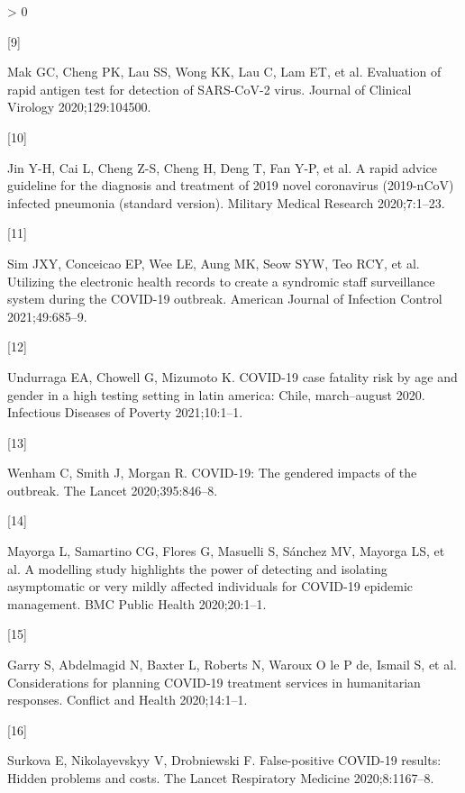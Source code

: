 \documentclass[]{elsarticle} %
\newlength{\cslhangindent}
\newlength{\csllabelwidth}
\newenvironment{CSLReferences}[2] %
 {%
  \setlength{\parindent}{0pt}
  \ifodd #1 \everypar{\setlength{\hangindent}{\cslhangindent}}\ignorespaces\fi
  \ifnum #2 > 0
  \setlength{\parskip}{#2\baselineskip}
  \fi
 }%
 {}
\newcommand{\CSLLeftMargin}[1]{\parbox[t]{\csllabelwidth}{#1}}
\newcommand{\CSLRightInline}[1]{\parbox[t]{\linewidth - \csllabelwidth}{#1}\break}
\begin{document}
\begin{CSLReferences}{0}{0}
\leavevmode\hypertarget{ref-mak2020evaluation}{}%
\CSLLeftMargin{{[}9{]} }
\CSLRightInline{Mak GC, Cheng PK, Lau SS, Wong KK, Lau C, Lam ET, et al. Evaluation of rapid antigen test for detection of SARS-CoV-2 virus. Journal of Clinical Virology 2020;129:104500.}

\leavevmode\hypertarget{ref-jin2020rapid}{}%
\CSLLeftMargin{{[}10{]} }
\CSLRightInline{Jin Y-H, Cai L, Cheng Z-S, Cheng H, Deng T, Fan Y-P, et al. A rapid advice guideline for the diagnosis and treatment of 2019 novel coronavirus (2019-nCoV) infected pneumonia (standard version). Military Medical Research 2020;7:1--23.}

\leavevmode\hypertarget{ref-sim2021utilizing}{}%
\CSLLeftMargin{{[}11{]} }
\CSLRightInline{Sim JXY, Conceicao EP, Wee LE, Aung MK, Seow SYW, Teo RCY, et al. Utilizing the electronic health records to create a syndromic staff surveillance system during the COVID-19 outbreak. American Journal of Infection Control 2021;49:685--9.}

\leavevmode\hypertarget{ref-undurraga2021covid}{}%
\CSLLeftMargin{{[}12{]} }
\CSLRightInline{Undurraga EA, Chowell G, Mizumoto K. COVID-19 case fatality risk by age and gender in a high testing setting in latin america: Chile, march--august 2020. Infectious Diseases of Poverty 2021;10:1--1.}

\leavevmode\hypertarget{ref-wenham2020covid}{}%
\CSLLeftMargin{{[}13{]} }
\CSLRightInline{Wenham C, Smith J, Morgan R. COVID-19: The gendered impacts of the outbreak. The Lancet 2020;395:846--8.}

\leavevmode\hypertarget{ref-mayorga2020modelling}{}%
\CSLLeftMargin{{[}14{]} }
\CSLRightInline{Mayorga L, Samartino CG, Flores G, Masuelli S, Sánchez MV, Mayorga LS, et al. A modelling study highlights the power of detecting and isolating asymptomatic or very mildly affected individuals for COVID-19 epidemic management. BMC Public Health 2020;20:1--1.}

\leavevmode\hypertarget{ref-garry2020considerations}{}%
\CSLLeftMargin{{[}15{]} }
\CSLRightInline{Garry S, Abdelmagid N, Baxter L, Roberts N, Waroux O le P de, Ismail S, et al. Considerations for planning COVID-19 treatment services in humanitarian responses. Conflict and Health 2020;14:1--1.}

\leavevmode\hypertarget{ref-surkova2020false}{}%
\CSLLeftMargin{{[}16{]} }
\CSLRightInline{Surkova E, Nikolayevskyy V, Drobniewski F. False-positive COVID-19 results: Hidden problems and costs. The Lancet Respiratory Medicine 2020;8:1167--8.}


\end{CSLReferences}
\end{document}
